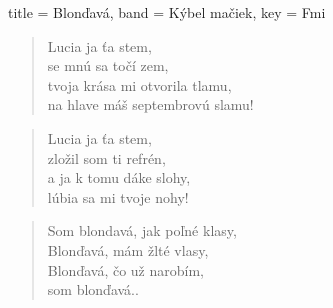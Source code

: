 \begin{song}[
    remember-chords = true ,
    verse/numbered = true ,
    transpose-capo = true 
  ]{
    title = Blonďavá,
    band = Kýbel mačiek,
    key  = Fmi
  }
    \begin{chorus}
    \end{chorus}
    
    \begin{verse}
    Lucia ja ťa stem, \\
    se mnú sa točí zem, \\
    tvoja krása mi otvorila tlamu, \\
    na hlave máš septembrovú slamu!
    \end{verse}
    
    \begin{verse}
    Lucia ja ťa stem, \\
    zložil som ti refrén, \\
    a ja k tomu dáke slohy, \\
    lúbia sa mi tvoje nohy!
    \end{verse}
    
    \begin{chorus}
    \end{chorus}
    
    \begin{verse}
    Som blondavá, jak poľné klasy, \\
   	Blonďavá, mám žlté vlasy, \\
    Blonďavá, čo už narobím, \\
    som blonďavá..
    \end{verse}
    
\end{song}